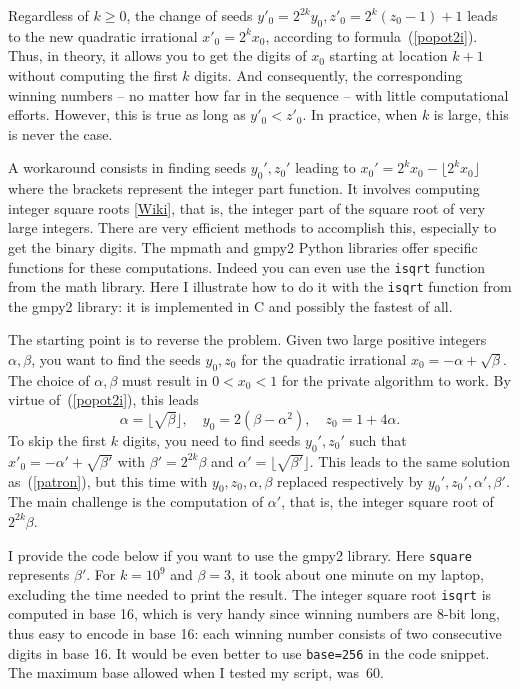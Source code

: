 \documentclass[oneside,10pt]{book}
\begin{document}
Regardless of $k\geq 0$, the change of seeds $y'_0 =  2^{2k}y_0, z'_0 = 2^k(z_0-1)+1$ leads to the new quadratic irrational $x'_0 = 2^k x_0$, according to formula~(\ref{popot2i}). Thus, in theory, it allows you to  get the digits of $x_0$ starting at location $k+1$ without  computing the first $k$ digits. And consequently, the corresponding winning numbers -- no matter how far in the sequence -- with little computational efforts. However, this is true as long as $y'_0 < z'_0$.
In practice, when $k$ is large, this is never the case.

A workaround consists in finding seeds $y_0', z_0'$ leading to $x_0' = 2^kx_0 - \lfloor 2^k x_0\rfloor$ where
 the brackets represent the integer part function. It involves computing
\textcolor{index}{integer square roots} [\href{https://en.wikipedia.org/wiki/Integer_square_root}{Wiki}], that is, the integer part of the square root of very large integers. There are very efficient methods to accomplish this,
 especially to get the binary digits. The \textcolor{index}{mpmath} and
\textcolor{index}{gmpy2} Python libraries offer specific functions for these
 computations. Indeed you can even use the \texttt{isqrt} function from the math library. Here I illustrate how to
 do it with the \texttt{isqrt} function from the gmpy2 library: it is implemented in C and possibly the fastest of all.

The starting point is to reverse the problem. Given two large positive integers $\alpha,\beta$, you want to find the seeds
 $y_0, z_0$ for the quadratic irrational
$x_0 = -\alpha + \sqrt{\beta}$.
The choice of $\alpha,\beta$ must result in $0<x_0<1$ for the private algorithm to work.
By virtue of~(\ref{popot2i}), this leads
\begin{equation}
\alpha = \lfloor \sqrt{\beta} \rfloor, \quad y_0 = 2(\beta - \alpha^2),\quad z_0 = 1 + 4\alpha. \label{patron}
\end{equation}
To skip the first $k$ digits, you need to find seeds $y_0',z_0'$ such that $x'_0 = -\alpha' +\sqrt{\beta'}$ with
 $\beta'= 2^{2k}\beta$ and $\alpha'=\lfloor \sqrt{\beta'} \rfloor$. This leads to the same solution
 as~(\ref{patron}), but this time with $y_0,z_0,\alpha,\beta$ replaced respectively by
$y_0',z_0',\alpha',\beta'$. The main challenge is the computation of $\alpha'$, that is, the integer square root of $2^{2k}\beta$.

I provide the code below if you want to use the gmpy2 library. Here \texttt{square} represents $\beta'$. For $k=10^9$ and $\beta=3$, it took about one minute on my laptop, excluding the time needed to print the result. The integer square root \texttt{isqrt} is computed in base 16, which is very handy since winning numbers are 8-bit long, thus easy to encode in base 16: each winning number consists of two consecutive digits in base 16.  It would be even better to use \texttt{base=256} in the code snippet. The maximum base allowed
 when I tested my script, was~60.
\end{document}
